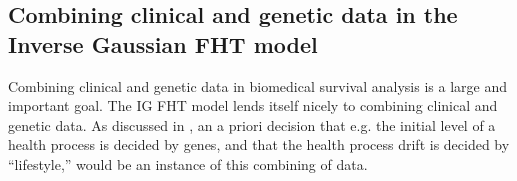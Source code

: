 


\subsection{Combining clinical and genetic data in the Inverse Gaussian FHT model}
Combining clinical and genetic data in biomedical survival analysis is a large and important goal.
The IG FHT model lends itself nicely to combining clinical and genetic data.
As discussed in \citet{aalengjessing2001}, an a priori
decision that e.g. the initial level of a health process is decided by genes, and that the health process drift is decided by
``lifestyle,'' would be an instance of this combining of data.